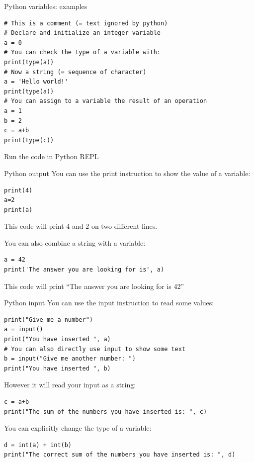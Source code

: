 \documentclass[aspectratio=169,]{beamer}
\begin{document}
\begin{frame}[fragile]{Python variables: examples}
    \begin{verbatim}
# This is a comment (= text ignored by python)
# Declare and initialize an integer variable
a = 0
# You can check the type of a variable with:
print(type(a))
# Now a string (= sequence of character)
a = 'Hello world!'
print(type(a))
# You can assign to a variable the result of an operation
a = 1
b = 2
c = a+b
print(type(c))
    \end{verbatim}
Run the code in Python REPL
\end{frame}

\begin{frame}[fragile]{Python output}
    You can use the \alert{print} instruction to show the value of a variable:
    \begin{verbatim}
print(4)
a=2
print(a)
    \end{verbatim}
    This code will print 4 and 2 on two different lines.

    You can also combine a string with a variable:
    \begin{verbatim}
a = 42
print('The answer you are looking for is', a)
    \end{verbatim}
    This code will print ``The answer you are looking for is 42''
\end{frame}

\begin{frame}[fragile]{Python input}
    You can use the \alert{input} instruction to read some values:
    \begin{verbatim}
print("Give me a number")
a = input()
print("You have inserted ", a)
# You can also directly use input to show some text
b = input("Give me another number: ")
print("You have inserted ", b)
    \end{verbatim}

    However it will read your input as a string:
    \begin{verbatim}
c = a+b
print("The sum of the numbers you have inserted is: ", c)
    \end{verbatim}

    You can explicitly change the type of a variable:
    \begin{verbatim}
d = int(a) + int(b)
print("The correct sum of the numbers you have inserted is: ", d)
    \end{verbatim}
\end{frame}
\end{document}
